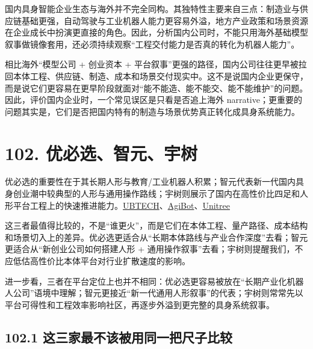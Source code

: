 

国内具身智能企业生态与海外并不完全同构。其独特性主要来自三点：制造业与供应链基础更强，自动驾驶与工业机器人能力更容易外溢，地方产业政策和场景资源在企业成长中扮演更直接的角色。因此，分析国内公司时，不能只用海外基础模型叙事做镜像套用，还必须持续观察“工程交付能力是否真的转化为机器人能力”。

相比海外“模型公司 + 创业资本 + 平台叙事”更强的路径，国内公司往往更早被拉回本体工程、供应链、制造、成本和场景交付现实中。这不是说国内企业更保守，而是说它们更容易在更早阶段就面对“能不能造、能不能交、能不能维护”的问题。因此，评价国内企业时，一个常见误区是只看是否追上海外 narrative；更重要的问题其实是，它们是否把国内特有的制造与场景优势真正转化成具身系统能力。

\section*{102. 优必选、智元、宇树}

优必选的重要性在于其长期人形与教育/工业机器人积累；智元代表新一代国内具身创业潮中较典型的人形与通用操作路线；宇树则展示了国内在高性价比四足和人形平台工程上的快速推进能力。\href{https://www.ubtrobot.com/}{UBTECH}、\href{https://www.agibot.com/}{AgiBot}、\href{https://www.unitree.com/}{Unitree}

这三者最值得比较的，不是“谁更火”，而是它们在本体工程、量产路径、成本结构和场景切入上的差异。优必选更适合从“长期本体路线与产业合作深度”去看；智元更适合从“新创业公司如何搭建人形 + 通用操作叙事”去看；宇树则提醒我们，不应低估高性价比本体平台对行业扩散速度的影响。

进一步看，三者在平台定位上也并不相同：优必选更容易被放在“长期产业化机器人公司”语境中理解；智元更接近“新一代通用人形叙事”的代表；宇树则常常先以平台可得性和工程效率影响社区，再逐步外溢到更完整的具身系统叙事。

\subsection*{102.1 这三家最不该被用同一把尺子比较}


